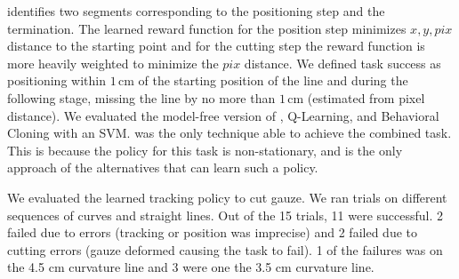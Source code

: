 \hirl identifies two segments corresponding to the positioning step and the termination.
The learned reward function for the position step minimizes $x,y,pix$ distance to the starting point and for the cutting step the reward function is more heavily weighted to minimize the $pix$ distance.
We defined task success as positioning within $1$\,cm of the starting position of the line and during the following stage, missing the line by no more than $1$\,cm (estimated from pixel distance).
We evaluated the model-free version of \hirl, Q-Learning, and Behavioral Cloning with an SVM.
\hirl was the only technique able to achieve the combined task.
This is because the policy for this task is non-stationary, and \hirl is the only approach of the alternatives that can learn such a policy.

We evaluated the learned tracking policy to cut gauze.
We ran trials on different sequences of curves and straight lines. 
Out of the 15 trials, 11 were successful.
2 failed due to \hirl errors (tracking or position was imprecise) and 2 failed due to cutting errors (gauze deformed causing the task to fail).
1 of the failures was on the 4.5 cm curvature line and 3 were one the 3.5 cm curvature line.




